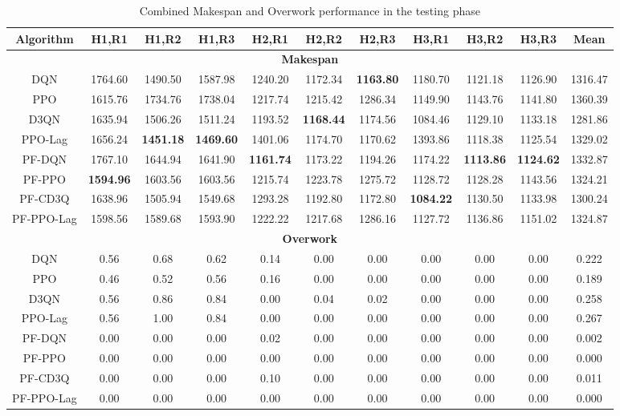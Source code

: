 \begin{table*}[htbp]
\centering
\caption{Combined Makespan and Overwork performance in the testing phase}\label{tab:combined}
\begin{tabular}{ccccccccccc}
\hline
Algorithm & H1,R1 & H1,R2 & H1,R3 & H2,R1 & H2,R2 & H2,R3 & H3,R1 & H3,R2 & H3,R3 & Mean \\
\hline
\multicolumn{11}{c}{\textbf{Makespan}} \\
\hline
DQN & 1764.60 & 1490.50 & 1587.98 & 1240.20 & 1172.34 & \textbf{1163.80} & 1180.70 & 1121.18 & 1126.90 & 1316.47 \\
PPO & 1615.76 & 1734.76 & 1738.04 & 1217.74 & 1215.42 & 1286.34 & 1149.90 & 1143.76 & 1141.80 & 1360.39 \\
D3QN & 1635.94 & 1506.26 & 1511.24 & 1193.52 & \textbf{1168.44} & 1174.56 & 1084.46 & 1129.10 & 1133.18 & 1281.86 \\
PPO-Lag & 1656.24 & \textbf{1451.18} & \textbf{1469.60} & 1401.06 & 1174.70 & 1170.62 & 1393.86 & 1118.38 & 1125.54 & 1329.02 \\
PF-DQN & 1767.10 & 1644.94 & 1641.90 & \textbf{1161.74} & 1173.22 & 1194.26 & 1174.22 & \textbf{1113.86} & \textbf{1124.62} & 1332.87 \\
PF-PPO & \textbf{1594.96} & 1603.56 & 1603.56 & 1215.74 & 1223.78 & 1275.72 & 1128.72 & 1128.28 & 1143.56 & 1324.21 \\
PF-CD3Q & 1638.96 & 1505.94 & 1549.68 & 1293.28 & 1192.80 & 1172.80 & \textbf{1084.22} & 1130.50 & 1133.98 & 1300.24 \\
PF-PPO-Lag & 1598.56 & 1589.68 & 1593.90 & 1222.22 & 1217.68 & 1286.16 & 1127.72 & 1136.86 & 1151.02 & 1324.87 \\
\hline
\multicolumn{11}{c}{\textbf{Overwork}} \\
\hline
DQN & 0.56 & 0.68 & 0.62 & 0.14 & 0.00 & 0.00 & 0.00 & 0.00 & 0.00 & 0.222 \\
PPO & 0.46 & 0.52 & 0.56 & 0.16 & 0.00 & 0.00 & 0.00 & 0.00 & 0.00 & 0.189 \\
D3QN & 0.56 & 0.86 & 0.84 & 0.00 & 0.04 & 0.02 & 0.00 & 0.00 & 0.00 & 0.258 \\
PPO-Lag & 0.56 & 1.00 & 0.84 & 0.00 & 0.00 & 0.00 & 0.00 & 0.00 & 0.00 & 0.267 \\
PF-DQN & 0.00 & 0.00 & 0.00 & 0.02 & 0.00 & 0.00 & 0.00 & 0.00 & 0.00 & 0.002 \\
PF-PPO & 0.00 & 0.00 & 0.00 & 0.00 & 0.00 & 0.00 & 0.00 & 0.00 & 0.00 & 0.000 \\
PF-CD3Q & 0.00 & 0.00 & 0.00 & 0.10 & 0.00 & 0.00 & 0.00 & 0.00 & 0.00 & 0.011 \\
PF-PPO-Lag & 0.00 & 0.00 & 0.00 & 0.00 & 0.00 & 0.00 & 0.00 & 0.00 & 0.00 & 0.000 \\
\hline
\end{tabular}
\end{table*}
